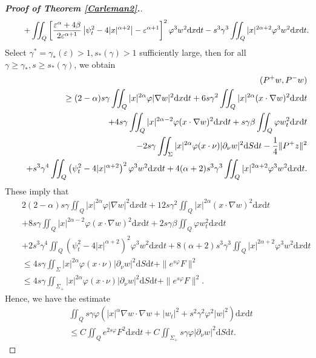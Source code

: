 \documentclass[11pt]{article}
\numberwithin{equation}{section}
\def\pt{\partial}
\def\e{\varepsilon }
\def\vp{\varphi}
\def\bf{\textbf}
\def\pt{\partial}
\def\al{\alpha}
\def\be{\beta}
\def\ga{\gamma}
\def\f{\frac}
\def\df{\mathrm d}
\begin{document}
\begin{proof}[{\rm \bf { Proof of  Theorem \ref{Carleman2}.}}]
\begin{eqnarray*}
				&&\hspace{4.5mm} +\iint_Q\left[\f{\e^\al+4\be}{2\e^{\al+1}}\left|\psi_t^2-4|x|^{\al+2}\right|-\e^{\al+1}\right]^2\vp^3w^2\df x\df t- s^3\ga^3\iint_Q|x|^{2\al+2}\vp^3w^2\df x\df t.
			\end{eqnarray*}
			Select $\ga^*=\ga_*(\e)>1, s_*(\ga)>1$   sufficiently large, then for all $\ga \geq \ga_*, s\geq s_*(\ga)$, we obtain
			\begin{eqnarray*}
				&&(P^+w,P^-w)\\
				&&\geq (2-\alpha)s\ga \iint_Q|x|^{2\al}\vp |\nabla w|^2\df x\df t+6s\ga^2\iint_Q|x|^{2\al}(x\cdot \nabla w)^2\df x\df t\\
				&&\hspace{4.5mm}+4s\ga\iint_Q|x|^{2\al-2}\vp (x\cdot \nabla w)^2\df x\df t +s\ga \be\iint_Q\vp w_t^2\df x\df t \\
				&&\hspace{4.5mm}-2s\ga \iint_\Sigma |x|^{2\al}  \vp (x\cdot \nu)|\pt_\nu w|^2\df S\df t-\f{1}{4}\|P^+z\|^2\\
				&&\hspace{4.5mm}+s^3\ga^4\iint_Q\left(\psi_t^2-4|x|^{\al+2}\right)^2\vp^3w^2\df x\df t +4(\al+2)s^3\ga^3\iint_Q|x|^{2\al+2}\vp^3w^2\df x\df t.
			\end{eqnarray*}
			These imply that
			\begin{eqnarray*}
				&&2(2-\alpha)s\ga \iint_Q|x|^{2\al}\vp |\nabla w|^2\df x\df t+12s\ga^2\iint_Q|x|^{2\al}(x\cdot \nabla w)^2\df x\df t\\
				&&+8s\ga\iint_Q|x|^{2\al-2}\vp (x\cdot \nabla w)^2\df x\df t +2s\ga \be\iint_Q\vp w_t^2\df x\df t \\
				&&+2s^3\ga^4\iint_Q\left(\psi_t^2-4|x|^{\al+2}\right)^2\vp^3w^2\df x\df t +8(\al+2)s^3\ga^3\iint_Q|x|^{2\al+2}\vp^3w^2\df x\df t\\
				&&\leq 4s\ga \iint_{\Sigma} |x|^{2\al}  \vp (x\cdot \nu)|\pt_\nu w|^2\df S\df t +\|e^{s\vp}F\|^2\\
				&&\leq 4s\ga \iint_{\Sigma_+} |x|^{2\al}  \vp (x\cdot \nu)|\pt_\nu w|^2\df S\df t +\|e^{s\vp}F\|^2.
			\end{eqnarray*}
			Hence, we have the estimate
			\begin{equation}\label{A-2}
				\begin{split}
					&\iint_Qs\ga \vp \left(|x|^\al \nabla w\cdot \nabla w+|w_t|^2+s^2\ga^2\vp^2|w|^2\right)\df x\df t\\
					&\leq C \iint_Qe^{2s\vp}F^2\df x\df t+C\iint_{\Sigma_+} s\ga \vp|\pt_\nu w|^2\df S\df t.
				\end{split}
			\end{equation}
			

\end{proof}
\end{document}
